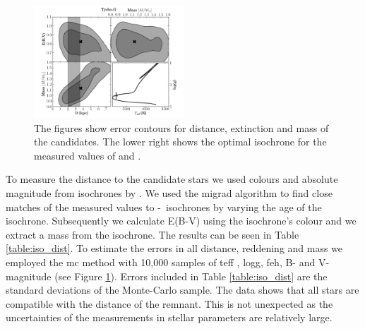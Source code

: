 \begin{figure}[tb]
   \includegraphics[width=0.5\textwidth]{chapter_sn1572_hires/plots/tycho-g-panel.pdf} 
   \caption[Distance, extinction and mass measurements in ]{The figures show error contours for distance, extinction and mass of the candidates. The lower right shows the optimal isochrone \citep{2004ApJ...612..168P}  for the measured values of  and . }
   \label{fig:mc_isochrone}
\end{figure}


To measure the distance to the candidate stars we used colours and absolute magnitude from isochrones by  \citet{2004ApJ...612..168P}. We used the \gls{migrad} algorithm  \citep{James:1975dr} to find close matches of the measured values to \teff-\logg\ isochrones by varying the age of the isochrone.  Subsequently we calculate E(B-V) using the isochrone's colour and we extract a mass from the isochrone. The results can be seen in Table \ref{table:iso_dist}. To estimate the errors in all distance, reddening and mass we employed the \gls{mc}
method with 10,000 samples of \gls{teff} , \gls{logg}, \gls{feh}, B- and V-magnitude (see Figure  \ref{fig:mc_isochrone}).  Errors included in Table \ref{table:iso_dist} are the standard deviations of the Monte-Carlo sample. 
The data shows that all stars are compatible with the distance of the remnant. This is not unexpected as the uncertainties of the measurements in stellar parameters are relatively large.






